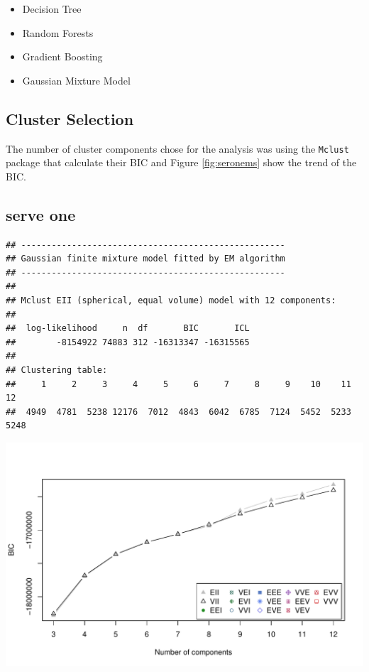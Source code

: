 \documentclass[11pt,a4paper,]{article}
\begin{document}
\begin{itemize}
\item
  Decision Tree
\item
  Random Forests
\item
  Gradient Boosting
\item
  Gaussian Mixture Model
\end{itemize}

\hypertarget{cluster-selection}{%
\subsection{Cluster Selection}\label{cluster-selection}}

The number of cluster components chose for the analysis was using the \texttt{Mclust} package that calculate their BIC and Figure \ref{fig:seronems} show the trend of the BIC.

\hypertarget{serve-one}{%
\subsection{serve one}\label{serve-one}}

\begin{verbatim}
## ---------------------------------------------------- 
## Gaussian finite mixture model fitted by EM algorithm 
## ---------------------------------------------------- 
## 
## Mclust EII (spherical, equal volume) model with 12 components: 
## 
##  log-likelihood     n  df       BIC       ICL
##        -8154922 74883 312 -16313347 -16315565
## 
## Clustering table:
##     1     2     3     4     5     6     7     8     9    10    11    12 
##  4949  4781  5238 12176  7012  4843  6042  6785  7124  5452  5233  5248
\end{verbatim}

\includegraphics{Report_files/figure-latex/seronems-1.pdf}
\end{document}
